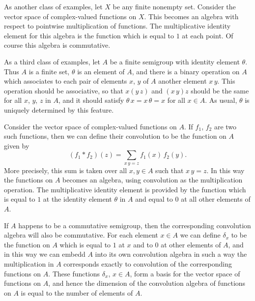\documentclass[12pt,leqno,draft]{article}
\begin{document}
	As another class of examples, let $X$ be any finite nonempty
set.  Consider the vector space of complex-valued functions on $X$.
This becomes an algebra with respect to pointwise multiplication of
functions.  The multiplicative identity element for this algebra is
the function which is equal to $1$ at each point.  Of course this
algebra is commutative.

	As a third class of examples, let $A$ be a finite semigroup
with identity element $\theta$.  Thus $A$ is a finite set, $\theta$ is
an element of $A$, and there is a binary operation on $A$ which
associates to each pair of elements $x$, $y$ of $A$ another element $x
\, y$.  This operation should be associative, so that $x (y \, z)$ and
$(x \, y) z$ should be the same for all $x$, $y$, $z$ in $A$, and it
should satisfy $\theta \, x = x \, \theta = x$ for all $x \in A$.  As
usual, $\theta$ is uniquely determined by this feature.

	Consider the vector space of complex-valued functions on $A$.
If $f_1$, $f_2$ are two such functions, then we can define their
convolution to be the function on $A$ given by
\begin{equation}
	(f_1 * f_2)(z) = \sum_{x \, y = z} f_1(x) \, f_2(y).
\end{equation}
More precisely, this sum is taken over all $x, y \in A$ such that $x
\, y = z$.  In this way the functions on $A$ becomes an algebra, using
convolution as the multiplication operation.  The multiplicative
identity element is provided by the function which is equal to $1$
at the identity element $\theta$ in $A$ and equal to $0$ at all other
elements of $A$.

	If $A$ happens to be a commutative semigroup, then the
corresponding convolution algebra will also be commutative.  For each
element $x \in A$ we can define $\delta_x$ to be the function on $A$
which is equal to $1$ at $x$ and to $0$ at other elements of $A$, and
in this way we can embedd $A$ into its own convolution algebra in such
a way the multiplication in $A$ corresponds exactly to convolution of
the corresponding functions on $A$.  These functions $\delta_x$, $x
\in A$, form a basis for the vector space of functions on $A$, and
hence the dimension of the convolution algebra of functions on $A$ is
equal to the number of elements of $A$.
\end{document}
